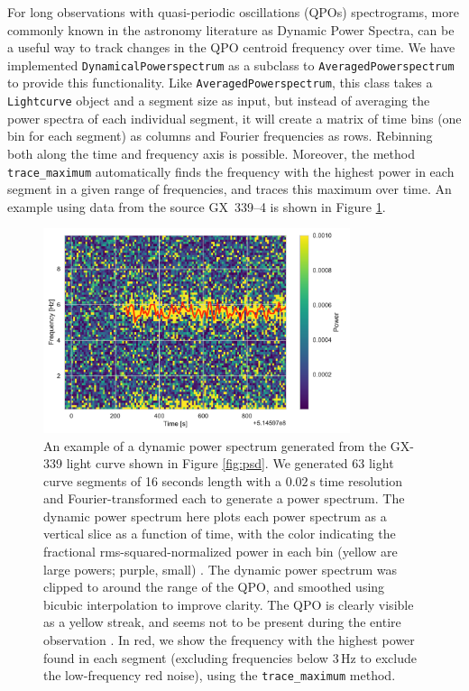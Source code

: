 \documentclass[twocolumn]{aastex62}
\newcommand{\lightcurve}{\texttt{Lightcurve}\xspace}
\begin{document}
For long observations with quasi-periodic oscillations (QPOs) spectrograms, more commonly known in the astronomy literature as Dynamic Power Spectra, can be a useful way to track changes in the QPO centroid frequency over time. 
We have implemented \texttt{DynamicalPowerspectrum} as a subclass to \texttt{AveragedPowerspectrum} to provide this functionality. 
Like \texttt{AveragedPowerspectrum}, this class takes a \lightcurve object and a segment size as input, but instead of averaging the power spectra of each individual segment, it will create a matrix of time bins (one bin for each segment) as columns and Fourier frequencies as rows. 
Rebinning both along the time and frequency axis is possible. 
Moreover, the method \texttt{trace\_maximum} automatically finds the frequency with the highest power in each segment in a given range of frequencies, and traces this maximum over time. 
An example using data from the source GX~339--4 is shown in Figure \ref{fig:dynspec}.
\begin{figure}[htbp]
\begin{center}
\includegraphics[width=9cm]{dyn_spec.pdf}
\caption{An example of a dynamic power spectrum generated from the GX-339 light curve shown in Figure \ref{fig:psd}. 
We generated 63 light curve segments of 16 seconds length with a $0.02\,\mathrm{s}$ time resolution and Fourier-transformed each to generate a power spectrum. 
The dynamic power spectrum here plots each power spectrum as a vertical slice as a function of time, with the color indicating the fractional rms-squared-normalized power in each bin (yellow are large powers; purple, small) . 
The dynamic power spectrum was clipped to around the range of the QPO, and smoothed using bicubic interpolation to improve clarity. 
The QPO is clearly visible as a yellow streak, and seems not to be present during the entire observation \citep[consistent with][]{belloni2005}. 
In red, we show the frequency with the highest power found in each segment (excluding frequencies below $3\,\mathrm{Hz}$ to exclude the low-frequency red noise), using the \texttt{trace\_maximum} method.}
\label{fig:dynspec}
\end{center}
\end{figure}
\end{document}
